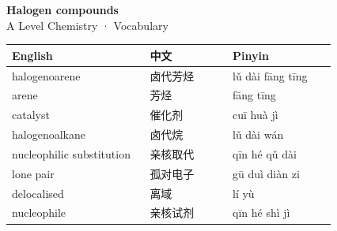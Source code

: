 \documentclass[11pt]{article}
\begin{document}
\begin{center}
  {\LARGE\bfseries Halogen compounds}\\[0.35em]
  {\large A Level Chemistry · Vocabulary}
\end{center}
\vspace{0.6em}

\begin{longtable}{@{}p{0.40\linewidth}p{0.24\linewidth}p{0.30\linewidth}@{}}
\toprule
\textbf{English} & \textbf{中文} & \textbf{Pinyin} \\
\midrule
\endhead
\bottomrule
\endlastfoot
halogenoarene & 卤代芳烃 & lǔ dài fāng tīng \\
arene & 芳烃 & fāng tīng \\
catalyst & 催化剂 & cuī huà jì \\
halogenoalkane & 卤代烷 & lǔ dài wán \\
nucleophilic substitution & 亲核取代 & qīn hé qǔ dài \\
lone pair & 孤对电子 & gū duì diàn zi \\
delocalised & 离域 & lí yù \\
nucleophile & 亲核试剂 & qīn hé shì jì \\
\end{longtable}
\end{document}
